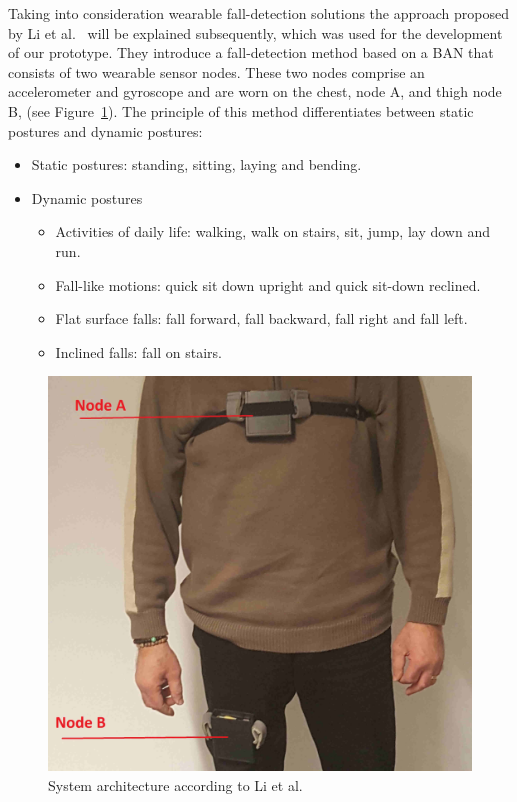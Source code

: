 \documentclass[conference]{IEEEtran}
\theoremstyle{definition}
\begin{document}
Taking into consideration wearable fall-detection solutions the approach proposed by Li et al.~\cite{Li2009} will be explained subsequently, 
which was used for the development of our prototype. They introduce a fall-detection method based on a BAN that consists 
of two wearable sensor nodes. These two nodes comprise an accelerometer and gyroscope and are worn on the chest, node A, and thigh 
node B, (see Figure~\ref{fig:simulation}). The principle of this method differentiates between static postures and dynamic postures: 

\begin{itemize}
 \item Static postures: standing, sitting, laying and bending.
 \item Dynamic postures
 \begin{itemize}
  \item Activities of daily life: walking, walk on stairs, sit, jump, lay down and run.
  \item Fall-like motions: quick sit down upright and quick sit-down reclined.
  \item Flat surface falls: fall forward, fall backward, fall right and fall left.
  \item Inclined falls: fall on stairs.
 \end{itemize}
\end{itemize}

\begin{figure}[!h]
  \centering
  \includegraphics[scale=0.2]{img/BasePrototype.png}
  \caption[System architecture]{System architecture according to Li et al.~\cite{Li2009}}
  \label{fig:simulation}
\end{figure}
\end{document}
